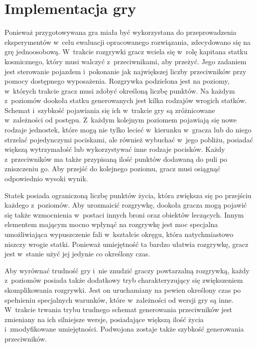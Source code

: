 \section{Implementacja gry}
Ponieważ przygotowywana gra miała być wykorzystana do przeprowadzenia eksperymentów w~celu ewaluacji opracowanego rozwiązania, zdecydowano się na grę jednoosobową. W~trakcie rozgrywki gracz wciela się w~rolę kapitana statku kosmicznego, który musi walczyć z~przeciwnikami, aby przeżyć. Jego zadaniem jest sterowanie pojazdem i~pokonanie jak największej liczby przeciwników przy pomocy dostępnego wyposażenia. Rozgrywka podzielona jest na poziomy, w~których trakcie gracz musi zdobyć określoną liczbę punktów. Na każdym z~poziomów dookoła statku generowanych jest kilka rodzajów wrogich statków. Schemat i~szybkość pojawiania się ich w~trakcie gry są zróżnicowane w~zależności od postępu. Z~każdym kolejnym poziomem pojawiają się nowe rodzaje jednostek, które mogą nie tylko lecieć w~kierunku w~gracza lub do niego strzelać pojedynczymi pociskami, ale również wybuchać w~jego pobliżu, posiadać większą wytrzymałość lub wykorzystywać inne rodzaje pocisków. Każdy z~przeciwników ma także przypisaną ilość punktów dodawaną do puli po zniszczeniu go. Aby przejść do kolejnego poziomu, gracz musi osiągnąć odpowiednio wysoki wynik.

Statek posiada ograniczoną liczbę punktów życia, która zwiększa się po przejściu każdego z~poziomów. Aby urozmaicić rozgrywkę, dookoła gracza mogą pojawić się także wzmocnienia w~postaci innych broni oraz obiektów leczących. Innym elementem mającym mocno wpłynąć na rozgrywkę jest moc specjalna umożliwiająca wypuszczenie fali w~kształcie okręgu, która natychmiastowo niszczy wrogie statki. Ponieważ umiejętność ta bardzo ułatwia rozgrywkę, gracz jest w~stanie użyć jej jedynie co określony czas. 

Aby wyrównać trudność gry i~nie znudzić graczy powtarzalną rozgrywką, każdy z~poziomów posiada także dodatkowy tryb charakteryzujący się zwiększeniem skomplikowania rozgrywki. Jest on uruchamiany na pewien określony czas po spełnieniu specjalnych warunków, które w~zależności od wersji gry są inne. W~trakcie trwania trybu trudnego schemat generowania przeciwników jest zmieniany na ich silniejsze wersje, posiadające większą ilość życia i~zmodyfikowane umiejętności. Podwojona zostaje także szybkość generowania przeciwników.

